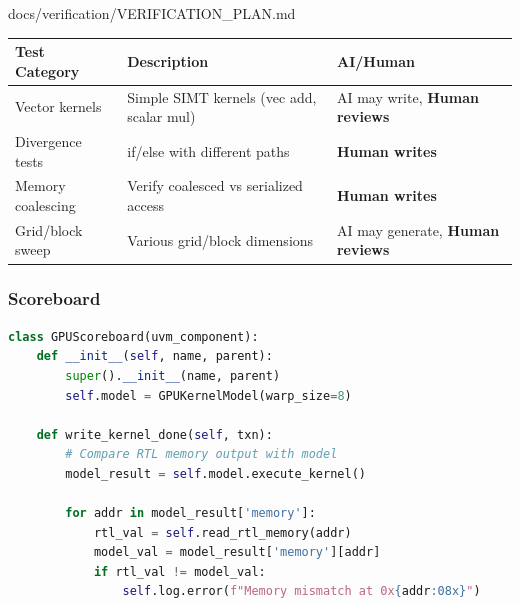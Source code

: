 \begin{relocated}{docs/verification/VERIFICATION_PLAN.md}
{
\begin{longtable}[]{@{}
  >{\centering\arraybackslash}p{}
  >{\centering\arraybackslash}p{}
  >{\centering\arraybackslash}p{}@{}}
\toprule\noalign{}
\begin{minipage}[b]{\linewidth}\centering
Test Category
\end{minipage} & \begin{minipage}[b]{\linewidth}\centering
Description
\end{minipage} & \begin{minipage}[b]{\linewidth}\centering
AI/Human
\end{minipage} \\
\midrule\noalign{}
\endhead
\bottomrule\noalign{}
\endlastfoot
Vector kernels & Simple SIMT kernels (vec add, scalar mul) & AI may
write, \textbf{Human reviews} \\
Divergence tests & if/else with different paths & \textbf{Human
writes} \\
Memory coalescing & Verify coalesced vs serialized access &
\textbf{Human writes} \\
Grid/\allowbreak{}block sweep & Various grid/\allowbreak{}block
dimensions & AI may generate, \textbf{Human reviews} \\
\end{longtable}
}

\subsubsection{Scoreboard}\label{ds:ch:verification-plan:scoreboard}

\begin{lstlisting}[language=Python]
class GPUScoreboard(uvm_component):
    def __init__(self, name, parent):
        super().__init__(name, parent)
        self.model = GPUKernelModel(warp_size=8)

    def write_kernel_done(self, txn):
        # Compare RTL memory output with model
        model_result = self.model.execute_kernel()

        for addr in model_result['memory']:
            rtl_val = self.read_rtl_memory(addr)
            model_val = model_result['memory'][addr]
            if rtl_val != model_val:
                self.log.error(f"Memory mismatch at 0x{addr:08x}")
\end{lstlisting}


\end{relocated}
